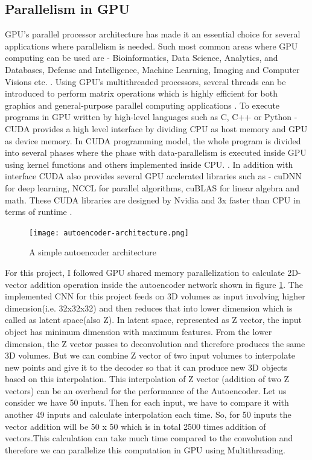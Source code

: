 \documentclass[11pt]{article}       %
\begin{document}
\subsection{Parallelism in GPU} \label{subrev3}
GPU's parallel processor architecture has made it an essential choice for several applications where parallelism is needed. Such most common areas where GPU computing can be used are - Bioinformatics, Data Science, Analytics, and Databases, Defense and Intelligence, Machine Learning, Imaging and Computer Visions etc. \cite{samel2016gpu}. Using GPU's multithreaded processors, several threads can be introduced to perform matrix operations which is highly efficient for both graphics and general-purpose parallel computing applications \cite{nickolls2008scalable}. To execute programs in GPU written by high-level languages such as C, C++ or Python - CUDA provides a high level interface by dividing CPU as host memory and GPU as device memory. In CUDA programming model, the whole program is divided into several phases where the phase with data-parallelism is executed inside GPU using kernel functions and others implemented inside CPU. \cite{ryoo2008optimization}. In addition with interface CUDA also provides several GPU acclerated libraries such as - cuDNN for deep learning, NCCL for parallel algorithms, cuBLAS for linear algebra and math. These CUDA libraries are designed by Nvidia and 3x faster than CPU in terms of runtime \cite{mis2}. \newline
\begin{figure}[h]
\begin{center}
\texttt{[image: autoencoder-architecture.png]}
\caption{A simple autoencoder architecture}\cite{mis4} \label{autoencoder}
\end{center}
\end{figure}
For this project, I followed GPU shared memory parallelization to calculate 2D-vector addition operation inside the autoencoder network shown in figure \ref{autoencoder}. The implemented CNN for this project feeds on 3D volumes as input involving higher dimension(i.e. 32x32x32) and then reduces that into lower dimension \cite{dr8} which is called as latent space(also Z). In latent space, represented as Z vector, the input object has minimum dimension with maximum features. From the lower dimension, the Z vector passes to deconvolution and therefore produces the same 3D volumes. But we can combine Z vector of two input volumes to interpolate new points and give it to the decoder so that it can produce new 3D objects based on this interpolation. This interpolation of Z vector (addition of two Z vectors) can be an overhead for the performance of the Autoencoder. Let us consider we have 50 inputs. Then for each input, we have to compare it with another 49 inputs and calculate interpolation each time. So, for 50 inputs the vector addition will be 50 x 50 which is in total 2500 times addition of vectors.This calculation can take much time compared to the convolution and therefore we can parallelize this computation in GPU using Multithreading.\newline
\end{document}
